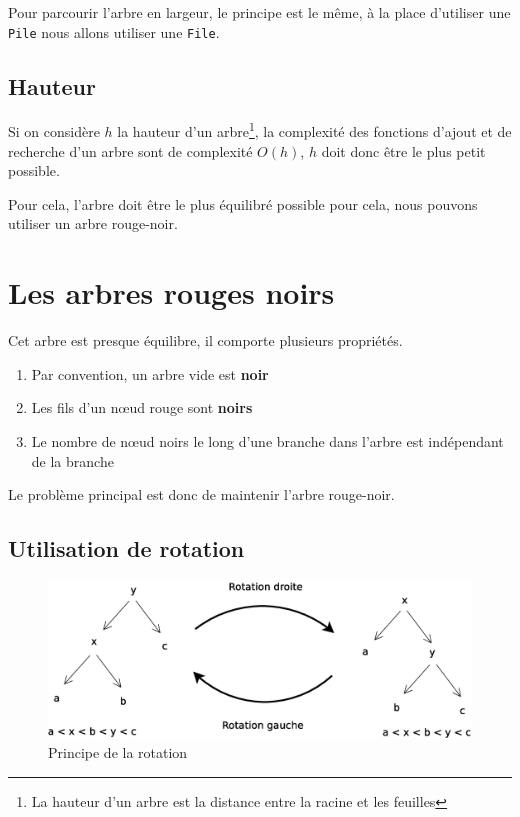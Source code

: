 Pour parcourir l'arbre en largeur, le principe est le même, à la place d'utiliser une \texttt{Pile} nous allons utiliser une \texttt{File}.


\subsection{Hauteur}
Si on considère $h$ la hauteur d'un arbre\footnote{La hauteur d'un arbre est la distance entre la racine et les feuilles}, la complexité des fonctions d'ajout et de recherche d'un arbre sont de complexité $O(h)$, $h$ doit donc être le plus petit possible.  

Pour cela, l'arbre doit être le plus équilibré possible pour cela, nous pouvons utiliser un arbre rouge-noir.

\section{Les arbres rouges noirs}
Cet arbre est presque équilibre, il comporte plusieurs propriétés.
\begin{enumerate}
	\item Par convention, un arbre vide est \textbf{noir}
	\item Les fils d'un nœud rouge sont \textbf{noirs}
	\item Le nombre de nœud noirs le long d'une branche dans l'arbre est indépendant de la branche 
\end{enumerate}

Le problème principal est donc de maintenir l'arbre rouge-noir.

\subsection{Utilisation de rotation}
\begin{figure}[H]
	\centering
	\includegraphics[width=12cm]{content/schemas/arbresRotation.eps}
	\caption{Principe de la rotation}
\end{figure}

